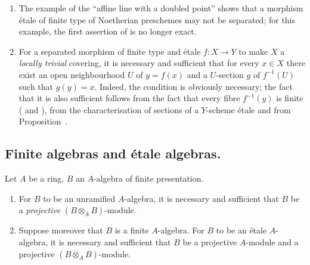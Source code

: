 \begin{remarks}[18.2.10]
\label{IV.18.2.10}
\begin{enumerate}
  \item[(i)] The example of the ``affine line with a doubled point''  shows that a morphism \'etale of finite type of Noetherian preschemes may not be separated;
for this example, the first assertion of  is no longer exact.

  \item[(ii)] For a separated morphism of finite type and \'etale $f:X\to Y$ to make $X$ a \emph{locally trivial} covering, it is necessary and sufficient that for every $x\in X$ there exist an open neighbourhood $U$ of $y=f(x)$ and a $U$-section $g$ of $f^{-1}(U)$ such that $g(y)=x$.
Indeed, the condition is obviously necessary;
the fact that it is also sufficient follows from the fact that every fibre $f^{-1}(y)$ is finite ( and ), from the characterisation of sections of a $Y$-scheme \'etale  and from Proposition~.
\end{enumerate}
\end{remarks}


\subsection{Finite algebras and \'etale algebras.}
\label{subsection:IV.18.3}

\begin{proposition}[18.3.1]
\label{IV.18.3.1}
Let $A$ be a ring, $B$ an $A$-algebra of finite presentation.
\begin{enumerate}
  \item[\textup{(i)}] For $B$ to be an unramified $A$-algebra, it is necessary and sufficient that $B$ be a \emph{projective} $(B\otimes_A B)$-module.
  \item[\textup{(ii)}] Suppose moreover that $B$ is a finite $A$-algebra.  For $B$ to be an \'etale $A$-algebra, it is necessary and sufficient that $B$ be a projective $A$-module and a projective $(B\otimes_A B)$-module.
\end{enumerate}
\end{proposition}

